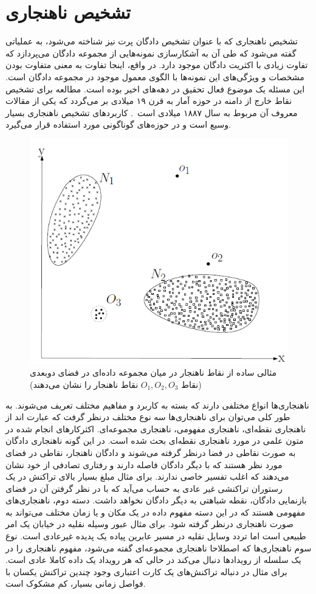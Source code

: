 \documentclass[12pt,a4paper]{report}
\begin{document}
	\section{تشخیص ناهنجاری}
تشخیص ناهنجاری که با عنوان تشخیص دادگان پرت نیز شناخته می‌شود، به عملیاتی گفته می‌شود که طی آن به آشکارسازی نمونه‌هایی از مجموعه دادگان می‌پردازد که تفاوت زیادی با اکثریت دادگان موجود دارد. در واقع، اینجا تفاوت به معنی متفاوت بودن مشخصات و ویژگی‌های این نمونه‌ها با الگوی معمول موجود در مجموعه دادگان است. این مسئله یک موضوع فعال تحقیق در دهه‌های اخیر بوده است. مطالعه برای تشخیص نقاط خارج از دامنه در حوزه آمار به قرن ۱۹ میلادی بر می‌گردد که یکی از مقالات معروف آن مربوط به سال ۱۸۸۷ میلادی است~\cite{Grubbs1969ProceduresFD}. کاربردهای تشخیص ناهنجاری بسیار وسیع است و در حوزه‌های گوناگونی مورد استفاده قرار می‌گیرد.\\

\begin{figure}[!hp]
	\begin{center}
		\includegraphics[width=0.5\linewidth]{./images/figures/anomaly-2d.png}

		\caption{
		مثالی ساده از نقاط ناهنجار در میان مجموعه داده‌ای در فضای دوبعدی (نقاط 
$O_1, O_2, O_3$
نقاط ناهنجار را نشان می‌دهند)
		\cite{V.Chandola}
		}		
		\label{fig:anomaly-example-1}
		\centering
	\end{center}
\end{figure}

ناهنجاری‌ها انواع مختلفی دارند که بسته به کاربرد و مفاهیم مختلف تعریف می‌شوند. به طور کلی می‌توان برای ناهنجاری‌ها سه نوع مختلف درنظر گرفت که عبارت اند از ناهنجاری نقطه‌ای،‌ ناهنجاری مفهومی‌،‌ ناهنجاری مجموعه‌ای. اکثرکارهای انجام شده در متون علمی در مورد ناهنجاری نقطه‌ای بحث شده است. در این گونه ناهنجاری دادگان به صورت نقاطی در فضا درنظر گرفته می‌شوند و دادگان ناهنجار، نقاطی در فضای مورد نظر هستند که با دیگر دادگان فاصله دارند و رفتاری تصادفی از خود نشان می‌دهند که اغلب تفسیر خاصی ندارند. برای مثال مبلغ بسیار بالای تراکنش در یک رستوران  تراکنشی غیر عادی به حساب می‌آید که با در نظر گرفتن آن در فضای بازنمایی دادگان، نقطه شباهتی به دیگر دادگان نخواهد داشت. دسته دوم، ناهنجاری‌های مفهومی هستند که در این دسته مفهوم داده در یک مکان‌ و یا زمان‌ مختلف می‌تواند به صورت ناهنجاری درنظر گرفته شود. برای مثال عبور وسیله نقلیه در خیابان یک امر طبیعی است اما تردد وسایل نقلیه در مسیر عابرین پیاده یک پدیده غیرعادی است. نوع سوم ناهنجاری‌ها که اصطلاحا ناهنجاری مجموعه‌ای گفته می‌شود،‌ مفهوم ناهنجاری را در یک سلسله از رویدادها دنبال می‌کند در حالی که هر رویداد یک داده کاملا عادی است. برای مثال در دنباله تراکنش‌های یک کارت اعتباری وجود چندین تراکنش یکسان با فواصل زمانی بسیار، کم مشکوک است.
\end{document}
